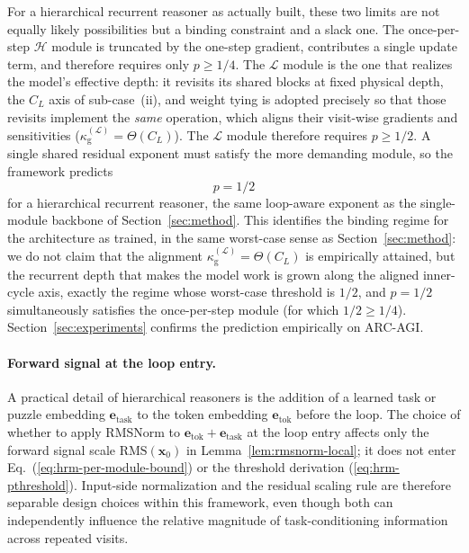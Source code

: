 \documentclass[11pt]{airesearch}
\begin{document}
For a hierarchical recurrent reasoner as actually built, these two limits are
not equally likely possibilities but a binding constraint and a slack one. The
once-per-step $\mathcal{H}$ module is truncated by the one-step gradient,
contributes a single update term, and therefore requires only $p\ge 1/4$. The
$\mathcal{L}$ module is the one that realizes the model's effective depth: it
revisits its shared blocks at fixed physical depth, the $C_L$ axis of
sub-case~(ii), and weight tying is adopted precisely so that those revisits
implement the \emph{same} operation, which aligns their visit-wise gradients
and sensitivities ($\kappa_{\mathrm{g}}^{(\mathcal{L})}=\Theta(C_L)$). The
$\mathcal{L}$ module therefore requires $p\ge 1/2$. A single shared residual
exponent must satisfy the more demanding module, so the framework predicts
\begin{equation}
  p = 1/2
  \label{eq:hrm-p-prediction}
\end{equation}
for a hierarchical recurrent reasoner, the same loop-aware exponent as the
single-module backbone of Section~\ref{sec:method}. This identifies the
binding regime for the architecture as trained, in the same worst-case sense
as Section~\ref{sec:method}: we do not claim that the alignment
$\kappa_{\mathrm{g}}^{(\mathcal{L})}=\Theta(C_L)$ is empirically attained,
but the recurrent depth that makes the model work is grown along the aligned
inner-cycle axis, exactly the regime whose worst-case threshold is $1/2$, and
$p=1/2$ simultaneously satisfies the
once-per-step module (for which $1/2\ge 1/4$). Section~\ref{sec:experiments} confirms the prediction empirically on ARC-AGI.

\paragraph{Forward signal at the loop entry.}
A practical detail of hierarchical reasoners is the addition of a learned
task or puzzle embedding $\mathbf{e}_{\mathrm{task}}$ to the token embedding
$\mathbf{e}_{\mathrm{tok}}$ before the loop. The choice of whether to apply
RMSNorm to $\mathbf{e}_{\mathrm{tok}}+\mathbf{e}_{\mathrm{task}}$ at the loop
entry affects only the forward signal scale $\mathrm{RMS}(\mathbf{x}_0)$ in
Lemma~\ref{lem:rmsnorm-local}; it does not enter
Eq.~(\ref{eq:hrm-per-module-bound}) or the threshold derivation
(\ref{eq:hrm-pthreshold}). Input-side normalization and the residual scaling rule are therefore separable design choices within this framework, even
though both can independently influence the relative magnitude of task-conditioning information across repeated visits.
\end{document}
